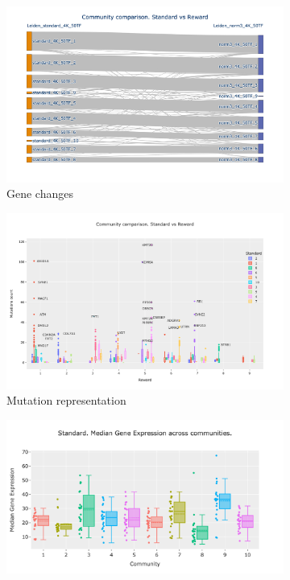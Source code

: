 \begin{figure}[!htb]
    \hfill
    \begin{subfigure}[b]{0.49\textwidth}
        \centering
        \includegraphics[width=\textwidth,keepaspectratio]{Sections/Network_I/Resources/P0/Comms/Sky_Comm_Comp_4K_v3.png}
        \caption{Gene changes}
    \end{subfigure}
    \hfill
     \begin{subfigure}[b]{0.49\textwidth}
            \centering
            \includegraphics[width=\textwidth,keepaspectratio]{Sections/Network_I/Resources/P0/Comms/Mut_Comm_Comp_4K_v3.png}
            \caption{Mutation representation}
    \end{subfigure}
    \hfill
    \hfill
    \begin{subfigure}[b]{0.47\textwidth}
        \centering
        \includegraphics[width=\textwidth,keepaspectratio]{Sections/Network_I/Resources/P0/Comms/P0_standard_4K_50TF_med.png}

\end{subfigure}
\end{figure}
